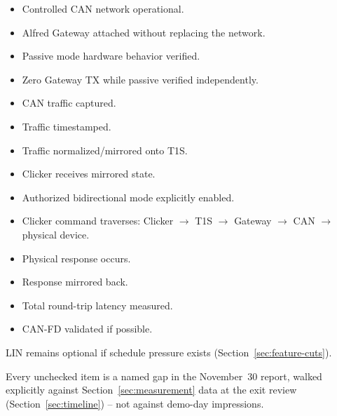 \begin{itemize}[itemsep=0.1em, label={$\square$}]
\item Controlled CAN network operational.
\item Alfred Gateway attached without replacing the network.
\item Passive mode hardware behavior verified.
\item Zero Gateway TX while passive verified independently.
\item CAN traffic captured.
\item Traffic timestamped.
\item Traffic normalized/mirrored onto T1S.
\item Clicker receives mirrored state.
\item Authorized bidirectional mode explicitly enabled.
\item Clicker command traverses: Clicker $\rightarrow$ T1S $\rightarrow$ Gateway $\rightarrow$ CAN $\rightarrow$ physical device.
\item Physical response occurs.
\item Response mirrored back.
\item Total round-trip latency measured.
\item CAN-FD validated if possible.
\end{itemize}

LIN remains optional if schedule pressure exists (Section~\ref{sec:feature-cuts}).

\begin{decision}[title={How this gate is scored}]
Every unchecked item is a named gap in the November~30 report, walked explicitly against Section~\ref{sec:measurement} data at the exit review (Section~\ref{sec:timeline}) -- not against demo-day impressions.
\end{decision}

